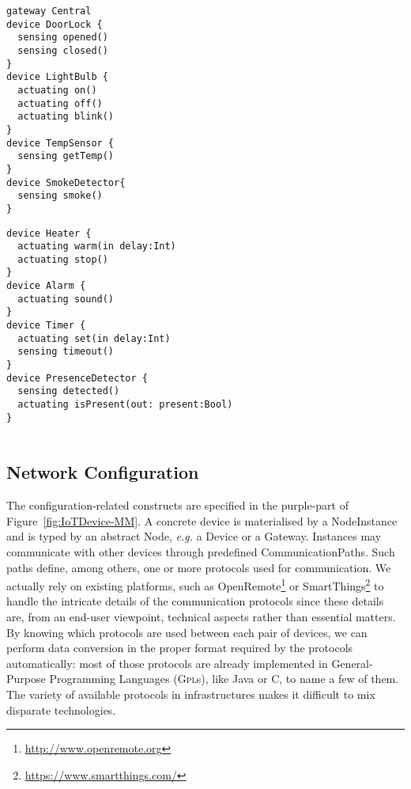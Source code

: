 \vspace{-0.5cm}
\begin{center}
\begin{minipage}[t]{.38\linewidth}
\begin{lstlisting}[language=iotdsl]	
gateway Central
device DoorLock {
  sensing opened()
  sensing closed()
}
device LightBulb {
  actuating on()
  actuating off()
  actuating blink()
}	
device TempSensor {
  sensing getTemp()
}
device SmokeDetector{
  sensing smoke()
}
\end{lstlisting}
\end{minipage}\hfill
\begin{minipage}[t]{.52\linewidth}
\begin{lstlisting}[language=iotdsl, firstnumber=17]
device Heater {
  actuating warm(in delay:Int)
  actuating stop()
}
device Alarm {
  actuating sound()
}
device Timer {
  actuating set(in delay:Int)
  sensing timeout()
}
device PresenceDetector {
  sensing detected()
  actuating isPresent(out: present:Bool)
}


\end{lstlisting}
\end{minipage}
\label{lis:RE-TypeDeclarations}
\end{center}


\vspace{-0.3cm}
\subsection{Network Configuration}
\label{sec:IoTDSL-NetworkConfiguration}
\vspace{-0.3cm}

The configuration-related constructs are specified in the purple-part of Figure~\ref{fig:IoTDevice-MM}. A concrete device is materialised by a \textsf{NodeInstance} and is typed by an abstract \textsf{Node}, \textit{e.g.} a \textsf{Device} or a \textsf{Gateway}. Instances may communicate with other \IOT devices through predefined \textsf{CommunicationPath}s. Such paths define, among others, one or more protocols used for communication. We actually rely on existing platforms, such as OpenRemote\footnote{\url{http://www.openremote.org}} or SmartThings\footnote{\url{https://www.smartthings.com/}} to handle the intricate details of the communication protocols since these details are, from an end-user viewpoint, technical aspects rather than essential matters. By knowing which protocols are used between each pair of devices, we can perform data conversion in the proper format required by the protocols automatically: most of those protocols are already implemented in General-Purpose Programming Languages (\textsc{Gpl}s), like Java or C, to name a few of them. The variety of available protocols in \IOT infrastructures makes it difficult to mix disparate technologies. 

